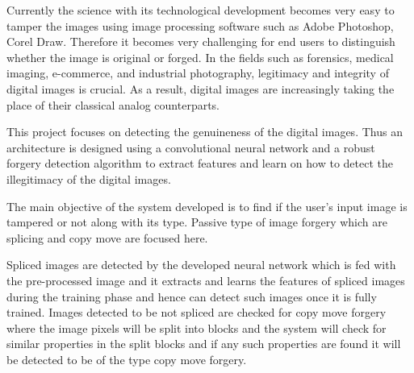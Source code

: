 
\tab Currently the science with its technological development becomes very easy to tamper the images using image processing software such as Adobe Photoshop, Corel Draw. Therefore it becomes very challenging for end users to distinguish whether the image is original or forged. In the fields such as forensics, medical imaging, e-commerce, and industrial photography, legitimacy and integrity of digital images is crucial. As a result, digital images are increasingly taking the place of their classical analog counterparts.

\tab This project focuses on detecting the genuineness of the digital images. Thus an architecture is designed using a convolutional neural network and a robust forgery detection algorithm to extract features and learn on how to detect the illegitimacy of the digital images.

\tab The main objective of the system developed is to find if the user's input image is tampered or not along with its type. Passive type of image forgery which are splicing and copy  move are focused here.

\tab Spliced images are detected by the developed neural network which is fed with the pre-processed image and it extracts and learns the features of spliced images during the training phase and hence can detect such images once it is fully trained. Images detected to be not spliced are checked for copy move forgery where the image pixels will be split into blocks and the system will check for similar properties in the split blocks and if any such properties are found it will be detected to be of the type copy move forgery.